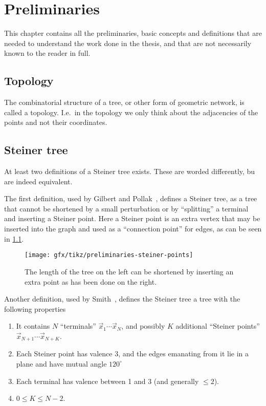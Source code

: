 {
\abnormalparskip{0pt}
\chapter{Preliminaries}
\label{cha:preliminaries}
}

This chapter contains all the preliminaries, basic concepts and definitions
that are needed to understand the work done in the thesis, and that are
not necessarily known to the reader in full.


\section{Topology}
\label{sec:topology}

The combinatorial structure of a tree, or other form of geometric network, is
called a topology.  I.e.\ in the topology we only think about the adjacencies of
the points and not their coordinates.

\section{Steiner tree}
\label{sec:steiner-tree}

At least two definitions of a Steiner tree exists. These are worded
differently, bu are indeed equivalent.

The first definition, used by Gilbert and Pollak~\cite{Gilbert1968}, defines a
Steiner tree, as a tree that cannot be shortened by a small perturbation or by
``splitting'' a terminal and inserting a Steiner point.  Here a Steiner point is
an extra vertex that may be inserted into the graph and used as a ``connection
point'' for edges, as can be seen in \cref{fig:preliminaries-steiner-point}.

\begin{figure}[htbp]
\centering
\texttt{[image: gfx/tikz/preliminaries-steiner-points]}
\caption[Steiner point of isosceles triangle.]{The length of the tree on the left
  can be shortened by inserting an extra point as has been done on the
  right.\label{fig:preliminaries-steiner-point}}
\end{figure}

Another definition, used by Smith~\cite{Smith1992}, defines the Steiner tree a
tree with the following properties

\begin{enumerate}
\item It contains $N$ ``terminals'' $\vec{x}_1 \cdots \vec{x}_N$, and
  possibly $K$ additional ``Steiner points'' $\vec{x}_{N+1} \cdots
  \vec{x}_{N+K}$.
\item Each Steiner point has valence 3, and the edges emanating from it lie in a
  plane and have mutual angle $120^{\circ}$
\item Each terminal has valence between 1 and 3 (and generally $\le 2$).
\item $0 \le K \le N-2$.
\end{enumerate}

